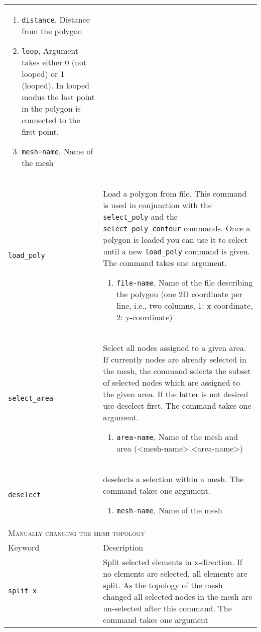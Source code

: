 \documentclass[noshowpacs,preprintnumbers,amsmath,amssymb, letter]{revtex4}
\begin{document}
\begin{longtable}{p{}p{}}
\begin{enumerate}
\item \texttt{distance}, Distance from the polygon
\item \texttt{loop}, Argument takes either 0 (not looped) or 1 (looped). In looped modus the last point in the polygon is connected to the first point.
\item \texttt{mesh-name}, Name of the mesh
\end{enumerate}\\
\texttt{load\_poly}	& Load a polygon from file. This command is used in conjunction with the \texttt{select\_poly} and the \texttt{select\_poly\_contour} commands. Once a polygon is loaded you can use it to select until a new \texttt{load\_poly} command is given. The command takes one argument.
\begin{enumerate}
\item \texttt{file-name}, Name of the file describing the polygon (one 2D coordinate per line, i.e., two columns, 1: x-coordinate, 2: y-coordinate)
\end{enumerate}\\
\texttt{select\_area}	& Select all nodes assigned to a given area. If currently nodes are already selected in the mesh, the command selects the subset of selected nodes which are assigned to the given area. If the latter is not desired use deselect first. The command takes one argument.
\begin{enumerate}
\item \texttt{area-name}, Name of the mesh and area (\textless mesh-name\textgreater .\textless area-name\textgreater )
\end{enumerate}\\
\texttt{deselect}	& deselects a selection within a mesh. The command takes one argument.
\begin{enumerate}
\item \texttt{mesh-name}, Name of the mesh
\end{enumerate}\\
\multicolumn{2}{l}{\textsc{Manually changing the mesh topology}} \\*
\hline
Keyword & Description \\
\texttt{split\_x}	& Split selected elements in x-direction. If no elements are selected, all elements are split. As the topology of the mesh changed all selected nodes in the mesh are un-selected after this command. The command takes one argument 

\end{longtable}
\end{document}
